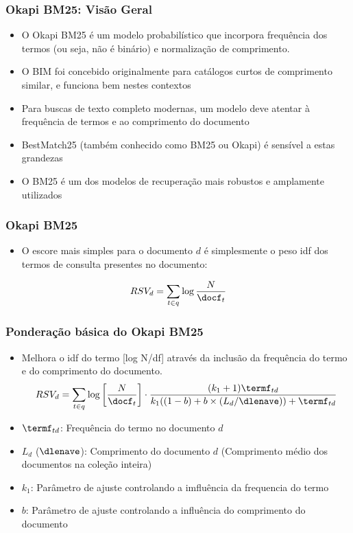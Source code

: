 \documentclass[compress]{beamer}
\def\myblue#1{\textcolor{texblue}{#1}}
\begin{document}
\begin{frame}[<+->]
\frametitle{Okapi BM25: Visão Geral}
\pause[2]

\begin{itemize} 
\item O Okapi BM25 é um modelo probabilístico que incorpora frequência dos termos (ou seja, não é binário) e normalização de comprimento.
\item O BIM foi concebido originalmente para catálogos curtos de comprimento similar, e funciona bem nestes contextos

\item Para buscas de texto completo modernas, um modelo deve atentar à frequência de termos e ao comprimento do documento

\item  BestMatch25 (também conhecido como \myblue{BM25} ou \myblue{Okapi}) é sensível a estas  grandezas

\item O BM25 é um dos modelos de recuperação mais robustos e amplamente utilizados 
\end{itemize}
\end{frame}

\begin{frame}[<+->]
\frametitle{Okapi BM25}
\pause

\begin{itemize}
\item O escore mais simples para o documento $d$ é simplesmente o peso idf dos termos de consulta presentes no documento:
\end{itemize}
\pause
\begin{equation}
\nonumber
RSV_d = \sum_{t \in q} \log\frac{N}{\docf_t}
\end{equation}

\end{frame}

\begin{frame}[<+->]
\frametitle{Ponderação básica do Okapi BM25 }
\pause[2]

\begin{itemize}
\item Melhora o idf do termo [log N/df] através da inclusão da frequência do termo e do comprimento do documento.
\begin{equation}
\nonumber
RSV_d = \sum_{t \in q} \log\left[\frac{N}{\docf_t}\right]\cdot
\frac{(k_1 + 1)\termf_{td}}
{k_1 ((1-b) + b\times (L_d/\dlenave)) + \termf_{td}} 
\end{equation}
\item $\termf_{td}$: Frequência do termo no documento $d$
\item $L_d$ ($\dlenave$): Comprimento do documento $d$ (Comprimento médio dos documentos na coleção inteira)
\item $k_1$: Parâmetro de ajuste controlando a imfluência da frequencia do termo
\item $b$: Parâmetro de ajuste controlando a influência do comprimento do documento 
\end{itemize}
\end{frame}
\end{document}
